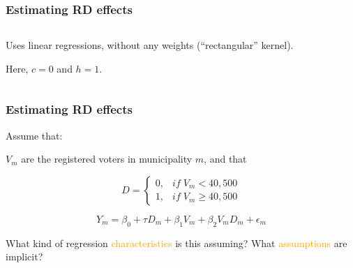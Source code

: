 \documentclass[12pt,english,dvipsnames,aspectratio=169,handout]{beamer}\usepackage[]{graphicx}\usepackage[]{xcolor}
\begin{document}
 
\begin{frame}
\frametitle{Estimating RD effects}

\begin{columns}
	\begin{column}{0.35\textwidth}
	Uses linear regressions, without any weights (``rectangular'' kernel).\bigskip
	
	Here, $c=0$ and $h=1$.
	\end{column}
	\begin{column}{0.65\textwidth}
	\end{column}
\end{columns}

\end{frame}


\begin{frame}
\frametitle{Estimating RD effects}
Assume that:

$V_m$ are the registered voters in municipality $m$, and that

\begin{equation}
D = \begin{cases}
0, & if\; V_m < 40,500 \\
1, & if\; V_m \geq 40,500 
\end{cases}
\label{eq:02}
\end{equation}

\begin{equation}
Y_m = \beta_0 + \tau D_m + \beta_1V_m + \beta_2V_mD_m + \epsilon_m  
  \label{eq:03}
\end{equation}
\pause

What kind of regression \textcolor{orange}{characteristics} is this assuming? What  \textcolor{orange}{assumptions} are implicit? 
\end{frame}
\end{document}
